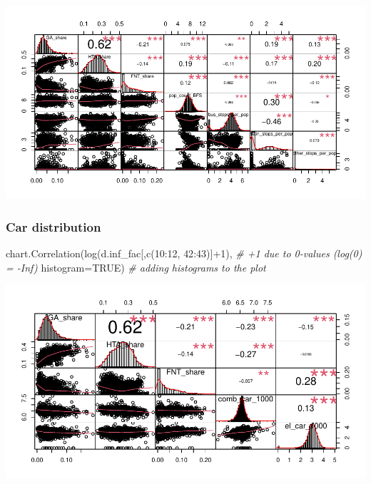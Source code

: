 \documentclass[
]{article}
\newenvironment{Shaded}{\begin{snugshade}}{\end{snugshade}}
\newcommand{\AttributeTok}[1]{\textcolor[rgb]{0.77,0.63,0.00}{#1}}
\newcommand{\CommentTok}[1]{\textcolor[rgb]{0.56,0.35,0.01}{\textit{#1}}}
\newcommand{\ConstantTok}[1]{\textcolor[rgb]{0.00,0.00,0.00}{#1}}
\newcommand{\DecValTok}[1]{\textcolor[rgb]{0.00,0.00,0.81}{#1}}
\newcommand{\FunctionTok}[1]{\textcolor[rgb]{0.00,0.00,0.00}{#1}}
\newcommand{\NormalTok}[1]{#1}
\newcommand{\SpecialCharTok}[1]{\textcolor[rgb]{0.00,0.00,0.00}{#1}}
\begin{document}
\includegraphics{Lin_Mod_Clus_Anal_files/figure-latex/unnamed-chunk-12-1.pdf}

\hypertarget{car-distribution}{%
\subsubsection{Car distribution}\label{car-distribution}}

\begin{Shaded}
\begin{Highlighting}[]
\FunctionTok{chart.Correlation}\NormalTok{(}\FunctionTok{log}\NormalTok{(d.inf\_fac[,}\FunctionTok{c}\NormalTok{(}\DecValTok{10}\SpecialCharTok{:}\DecValTok{12}\NormalTok{, }\DecValTok{42}\SpecialCharTok{:}\DecValTok{43}\NormalTok{)]}\SpecialCharTok{+}\DecValTok{1}\NormalTok{), }\CommentTok{\# +1 due to 0{-}values (log(0) = {-}Inf)}
                  \AttributeTok{histogram=}\ConstantTok{TRUE}\NormalTok{) }\CommentTok{\# adding histograms to the plot}
\end{Highlighting}
\end{Shaded}

\includegraphics{Lin_Mod_Clus_Anal_files/figure-latex/unnamed-chunk-13-1.pdf}
\end{document}
